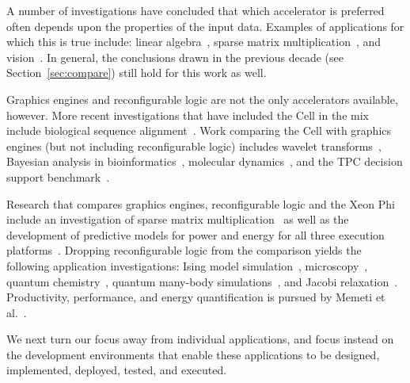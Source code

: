 A number of investigations have concluded that which accelerator
is preferred often depends upon the properties of the input data.
Examples of applications for which this is true include:
linear algebra~\cite{gchg16,sll+13},
sparse matrix multiplication~\cite{gsbh16},
and vision~\cite{mfo+16}.
In general, the conclusions drawn in the previous decade (see
Section~\ref{sec:compare}) still hold for this work as well.

Graphics engines and reconfigurable logic are not the only accelerators
available, however.  More recent investigations that have included the Cell in
the mix include biological sequence alignment~\cite{bal+12}.
Work comparing the Cell with graphics engines (but not including
reconfigurable logic) includes
wavelet transforms~\cite{bck+11},
Bayesian analysis in bioinformatics~\cite{pts+12},
molecular dynamics~\cite{pts+12}, and the TPC decision support
benchmark~\cite{pts+12}.

Research that compares graphics engines, reconfigurable logic and
the Xeon Phi include an investigation of
sparse matrix multiplication~\cite{gsbh16} as well as the development of
predictive models for power and energy for all three
execution platforms~\cite{opr+17}.
Dropping reconfigurable logic from the comparison yields the following
application investigations:
Ising model simulation~\cite{ws13},
microscopy~\cite{tkk+14},
quantum chemistry~\cite{lrg14},
quantum many-body simulations~\cite{Lyakh15}, and
Jacobi relaxation~\cite{cv16}.
Productivity, performance, and energy quantification is pursued
by Memeti et al.~\cite{mlp+17}.

We next turn our focus away from individual applications, and focus
instead on the development environments that enable these applications
to be designed, implemented, deployed, tested, and executed.

